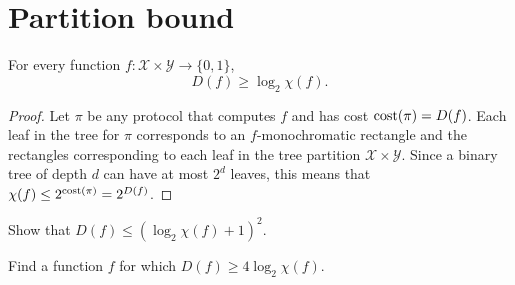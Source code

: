 \section{Partition bound}

\begin{lemma}
	For every function $f : \mathcal{X} \times \mathcal{Y} \to \{0,1\}$, 
	\[
	D(f) \ge \log_2 \chi(f).
	\]
\end{lemma}

\begin{proof}
	Let $\pi$ be any protocol that computes $f$ and has cost $\mathrm{cost}(\pi) = D(f)$. Each leaf in the tree for $\pi$ corresponds to an $f$-monochromatic rectangle and the rectangles corresponding to each leaf in the tree partition $\mathcal{X} \times \mathcal{Y}$. Since a binary tree of depth $d$ can have at most $2^d$ leaves, this means that $\chi(f) \le 2^{\mathrm{cost}(\pi)} = 2^{D(f)}$. 
\end{proof}

\exercises

\begin{exercise} %
	Show that $D(f) \le (\log_2 \chi(f) + 1)^2$.
\end{exercise}

\begin{open}
	Find a function $f$ for which $D(f) \ge 4 \log_2 \chi(f)$.
\end{open}